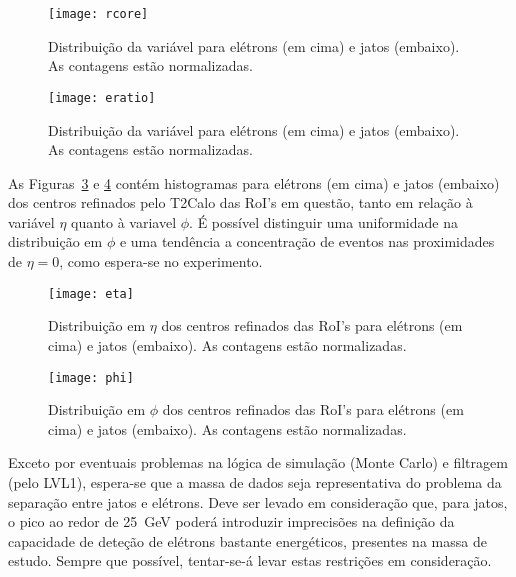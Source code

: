 \begin{figure}
\begin{center}
\texttt{[image: rcore]}
\end{center}
\caption{Distribuição da variável \rcore para elétrons (em cima) e jatos
(embaixo). As contagens estão normalizadas.}
\label{fig:rcore}
\end{figure}

\begin{figure}
\begin{center}
\texttt{[image: eratio]}
\end{center}
\caption{Distribuição da variável \eratio para elétrons (em cima) e jatos
(embaixo). As contagens estão normalizadas.}
\label{fig:eratio}
\end{figure}

As Figuras~\ref{fig:eta} e \ref{fig:phi} contém histogramas para elétrons (em
cima) e jatos (embaixo) dos centros refinados pelo T2Calo das RoI's em questão,
tanto em relação à variável $\eta$ quanto à variavel $\phi$. É possível
distinguir uma uniformidade na distribuição em $\phi$ e uma tendência a
concentração de eventos nas proximidades de $\eta=0$, como espera-se no
experimento.

\begin{figure}
\begin{center}
\texttt{[image: eta]}
\end{center}
\caption{Distribuição em $\eta$ dos centros refinados das RoI's para elétrons
(em cima) e jatos (embaixo). As contagens estão normalizadas.}
\label{fig:eta}
\end{figure}

\begin{figure}
\begin{center}
\texttt{[image: phi]}
\end{center}
\caption{Distribuição em $\phi$ dos centros refinados das RoI's para elétrons
(em cima) e jatos (embaixo). As contagens estão normalizadas.}
\label{fig:phi}
\end{figure}

Exceto por eventuais problemas na lógica de simulação (Monte Carlo) e filtragem
(pelo LVL1), espera-se que a massa de dados seja representativa do problema da
separação entre jatos e elétrons. Deve ser levado em consideração que, para
jatos, o pico ao redor de 25~GeV poderá introduzir imprecisões na definição da
capacidade de deteção de elétrons bastante energéticos, presentes na massa de
estudo. Sempre que possível, tentar-se-á levar estas restrições em
consideração.

